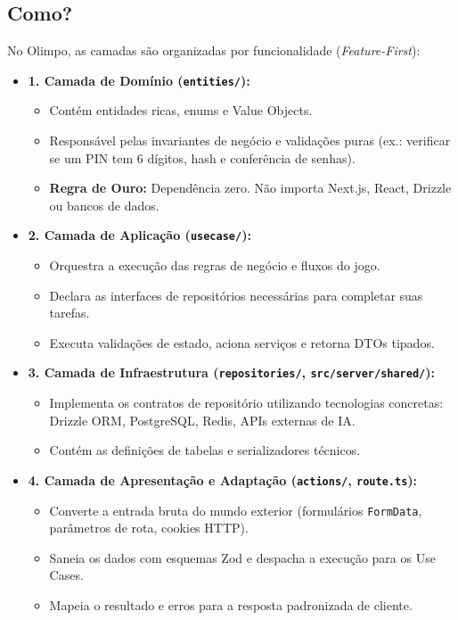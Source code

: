 \documentclass[12pt,a4paper]{article}
\begin{document}
\subsection{Como?}
No Olimpo, as camadas são organizadas por funcionalidade (\textit{Feature-First}):
\begin{itemize}
  \item \textbf{1. Camada de Domínio (\texttt{entities/}):}
  \begin{itemize}
    \item Contém entidades ricas, enums e Value Objects.
    \item Responsável pelas invariantes de negócio e validações puras (ex.: verificar se um PIN tem 6 dígitos, hash e conferência de senhas).
    \item \textbf{Regra de Ouro:} Dependência zero. Não importa Next.js, React, Drizzle ou bancos de dados.
  \end{itemize}
  \item \textbf{2. Camada de Aplicação (\texttt{usecase/}):}
  \begin{itemize}
    \item Orquestra a execução das regras de negócio e fluxos do jogo.
    \item Declara as interfaces de repositórios necessárias para completar suas tarefas.
    \item Executa validações de estado, aciona serviços e retorna DTOs tipados.
  \end{itemize}
  \item \textbf{3. Camada de Infraestrutura (\texttt{repositories/}, \texttt{src/server/shared/}):}
  \begin{itemize}
    \item Implementa os contratos de repositório utilizando tecnologias concretas: Drizzle ORM, PostgreSQL, Redis, APIs externas de IA.
    \item Contém as definições de tabelas e serializadores técnicos.
  \end{itemize}
  \item \textbf{4. Camada de Apresentação e Adaptação (\texttt{actions/}, \texttt{route.ts}):}
  \begin{itemize}
    \item Converte a entrada bruta do mundo exterior (formulários \texttt{FormData}, parâmetros de rota, cookies HTTP).
    \item Saneia os dados com esquemas Zod e despacha a execução para os Use Cases.
    \item Mapeia o resultado e erros para a resposta padronizada de cliente.
  \end{itemize}
\end{itemize}
\end{document}
